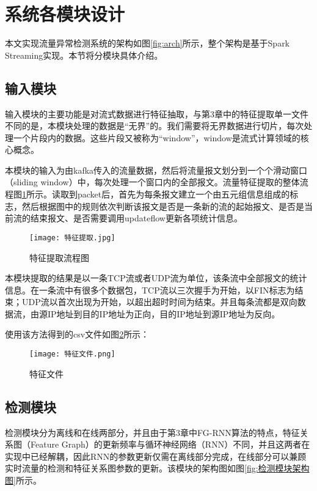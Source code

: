 \section{系统各模块设计}
本文实现流量异常检测系统的架构如图\ref{fig:arch}所示，整个架构是基于Spark Streaming实现。本节将分模块具体介绍。
\subsection{输入模块}
输入模块的主要功能是对流式数据进行特征抽取，与第3章中的特征提取单一文件不同的是，本模块处理的数据是“无界”的。我们需要将无界数据进行切片，每次处理一个片段内的数据。这些片段又被称为“window”，window是流式计算领域的核心概念。

本模块的输入为由kafka传入的流量数据，然后将流量报文划分到一个个滑动窗口（sliding window）中，每次处理一个窗口内的全部报文。流量特征提取的整体流程图\ref{fig:特征提取}所示。读取到packet后，首先为每条报文建立一个由五元组信息组成的标志，然后根据图中的规则依次判断该报文是否是一条新的流的起始报文、是否是当前流的结束报文、是否需要调用updateflow更新各项统计信息。

\begin{figure}
  \centering
  \texttt{[image: 特征提取.jpg]}
  \caption{特征提取流程图}
  \label{fig:特征提取}
\end{figure}

本模块提取的结果是以一条TCP流或者UDP流为单位，该条流中全部报文的统计信息。在一条流中有很多个数据包，TCP流以三次握手为开始，以FIN标志为结束；UDP流以首次出现为开始，以超出超时时间为结束。并且每条流都是双向数据流，由源IP地址到目的IP地址为正向，目的IP地址到源IP地址为反向。

使用该方法得到的csv文件如图\ref{fig:特征文件}所示：
\begin{figure}
    \centering
    \texttt{[image: 特征文件.png]}
    \caption{特征文件}
    \label{fig:特征文件}
  \end{figure}


\subsection{检测模块}
检测模块分为离线和在线两部分，并且由于第3章中FG-RNN算法的特点，特征关系图（Feature Graph）的更新频率与循环神经网络（RNN）不同，并且这两者在实现中已经解耦，因此RNN的参数更新仅需在离线部分完成，在线部分可以兼顾实时流量的检测和特征关系图参数的更新。该模块的架构图如图\ref{fig:检测模块架构图}所示。


